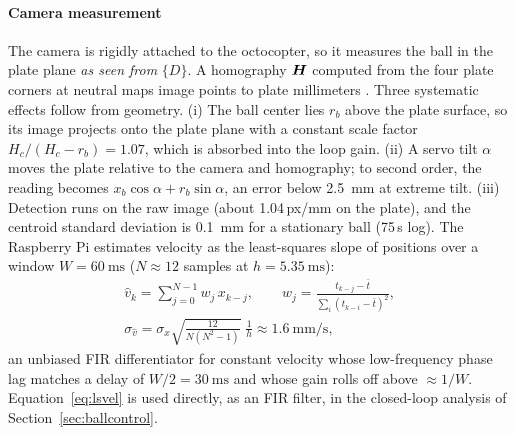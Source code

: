 \paragraph{Camera measurement}
The camera is rigidly attached to the octocopter, so it measures the ball in the plate plane \emph{as seen from} $\{D\}$. A homography $\bm{H}$ computed from the four plate corners at neutral maps image points to plate millimeters \cite{hartley2004}. Three systematic effects follow from geometry. (i) The ball center lies $r_b$ above the plate surface, so its image projects onto the plate plane with a constant scale factor $H_c/(H_c-r_b)=1.07$, which is absorbed into the loop gain. (ii) A servo tilt $\alpha$ moves the plate relative to the camera and homography; to second order, the reading becomes $x_b\cos\alpha+r_b\sin\alpha$, an error below \SI{2.5}{\milli\metre} at extreme tilt. (iii) Detection runs on the raw image (about 1.04\,px/mm on the plate), and the centroid standard deviation is \SI{0.1}{\milli\metre} for a stationary ball (75\,s log). The Raspberry Pi estimates velocity as the least-squares slope of positions over a window $W=\SI{60}{\milli\second}$ ($N\approx12$ samples at $h=\SI{5.35}{\milli\second}$):
\begin{gather}
  \hat v_k=\sum_{j=0}^{N-1}w_j\,x_{k-j},\qquad w_j=\frac{t_{k-j}-\bar t}{\sum_i (t_{k-i}-\bar t)^2}, \label{eq:lsvel}\\
  \sigma_{\hat v}=\sigma_x\sqrt{\frac{12}{N(N^2-1)}}\;\frac1h\approx\SI{1.6}{\milli\metre\per\second}, \nonumber
\end{gather}
an unbiased FIR differentiator for constant velocity whose low-frequency phase lag matches a delay of $W/2=\SI{30}{\milli\second}$ and whose gain rolls off above $\approx1/W$. Equation~\eqref{eq:lsvel} is used directly, as an FIR filter, in the closed-loop analysis of Section~\ref{sec:ballcontrol}.
